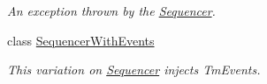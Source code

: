 \begin{DoxyCompactItemize}
\begin{DoxyCompactList}\small\item\em An exception thrown by the \hyperlink{classstrange_1_1extensions_1_1sequencer_1_1impl_1_1_sequencer}{Sequencer}. \end{DoxyCompactList}\item 
class \hyperlink{classstrange_1_1extensions_1_1sequencer_1_1impl_1_1_sequencer_with_events}{Sequencer\-With\-Events}
\begin{DoxyCompactList}\small\item\em This variation on \hyperlink{classstrange_1_1extensions_1_1sequencer_1_1impl_1_1_sequencer}{Sequencer} injects Tm\-Events. \end{DoxyCompactList}\end{DoxyCompactItemize}
